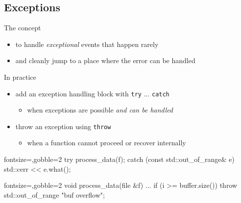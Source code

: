 \subsection[except]{Exceptions}

\begin{frame}[fragile]
  \begin{block}{The concept}
    \begin{itemize}
      \item to handle \textit{exceptional} events that happen rarely
      \item and cleanly jump to a place where the error can be handled
    \end{itemize}
  \end{block}
  \begin{block}{In practice}
    \begin{itemize}
      \item add an exception handling block with \texttt{try} ... \texttt{catch}
      \begin{itemize}
        \item when exceptions are possible \textit{and can be handled}
      \end{itemize}
      \item throw an exception using \texttt{throw}
      \begin{itemize}
        \item when a function cannot proceed or recover internally
      \end{itemize}
    \end{itemize}
  \end{block}
  \begin{multicols}{2}
    \begin{cppcode*}{fontsize=\small,gobble=2}
      try {
        process_data(f);
      } catch (const
        std::out_of_range& e) {
        std::cerr << e.what();
      }
    \end{cppcode*}
    \columnbreak
    \begin{cppcode*}{fontsize=\small,gobble=2}
      void process_data(file &f) {
        ...
        if (i >= buffer.size())
          throw std::out_of_range{
            "buf overflow"};
      }
    \end{cppcode*}
  \end{multicols}
\end{frame}

